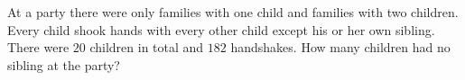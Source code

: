 At a party there were only families with one child and families with two children. Every child shook hands with every other child except his or her own sibling. There were $20$ children in total and $182$ handshakes. How many children had no sibling at the party?
